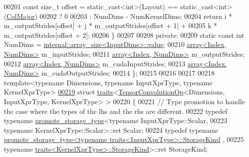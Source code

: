 \begin{DoxyCode}
00201     \textcolor{keyword}{const} \textcolor{keywordtype}{size\_t} offset = \textcolor{keyword}{static\_cast<}\textcolor{keywordtype}{int}\textcolor{keyword}{>}(Layout) == static\_cast<int>(\hyperlink{group__enums_ggaacded1a18ae58b0f554751f6cdf9eb13a0cbd4bdd0abcfc0224c5fcb5e4f6669a}{ColMajor})
00202                               ? 0
00203                               : NumDims - NumKernelDims;
00204     \textcolor{keywordflow}{return} i * m\_outputStrides[offset] + j * m\_outputStrides[offset + 1] +
00205            k * m\_outputStrides[offset + 2];
00206   \}
00207 
00208  \textcolor{keyword}{private}:
00209   \textcolor{keyword}{static} \textcolor{keyword}{const} \textcolor{keywordtype}{int} NumDims = \hyperlink{struct_eigen_1_1internal_1_1array__size}{internal::array\_size<InputDims>::value};
00210   \hyperlink{class_eigen_1_1array}{array<Index, NumDims>} m\_inputStrides;
00211   \hyperlink{class_eigen_1_1array}{array<Index, NumDims>} m\_outputStrides;
00212   \hyperlink{class_eigen_1_1array}{array<Index, NumDims>} m\_cudaInputStrides;
00213   \hyperlink{class_eigen_1_1array}{array<Index, NumDims>} m\_cudaOutputStrides;
00214 \};
00215 
00216 
00217 
00218 \textcolor{keyword}{template}<\textcolor{keyword}{typename} Dimensions, \textcolor{keyword}{typename} InputXprType, \textcolor{keyword}{typename} KernelXprType>
\hyperlink{struct_eigen_1_1internal_1_1traits_3_01_tensor_convolution_op_3_01_dimensions_00_01_input_xpr_tyede4d3ebe1b8839795edc93275eed3f9}{00219} \textcolor{keyword}{struct }\hyperlink{struct_eigen_1_1internal_1_1traits}{traits}<\hyperlink{class_eigen_1_1_tensor_convolution_op}{TensorConvolutionOp}<Dimensions, InputXprType, KernelXprType> >
00220 \{
00221   \textcolor{comment}{// Type promotion to handle the case where the types of the lhs and the rhs are different.}
00222   \textcolor{keyword}{typedef} \textcolor{keyword}{typename} \hyperlink{struct_eigen_1_1internal_1_1promote__storage__type}{promote\_storage\_type}<\textcolor{keyword}{typename} InputXprType::Scalar,
00223                                         \textcolor{keyword}{typename} KernelXprType::Scalar>::ret Scalar;
00224   \textcolor{keyword}{typedef} \textcolor{keyword}{typename} 
      \hyperlink{struct_eigen_1_1internal_1_1promote__storage__type}{promote\_storage\_type<typename traits<InputXprType>::StorageKind}
      ,
00225                                         \textcolor{keyword}{typename} 
      \hyperlink{struct_eigen_1_1internal_1_1traits}{traits<KernelXprType>::StorageKind}>::ret StorageKind;

\end{DoxyCode}
